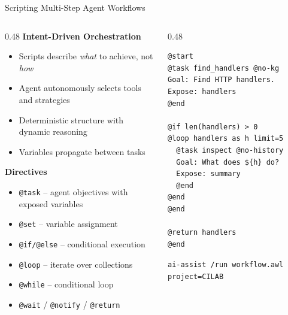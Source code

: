 \documentclass[aspectratio=169,10pt]{beamer}
\begin{document}
\begin{frame}[fragile]{Scripting Multi-Step Agent Workflows}
\begin{columns}[T]
\begin{column}{0.48\textwidth}
\textbf{Intent-Driven Orchestration}
\begin{itemize}\scriptsize\setlength{\itemsep}{1pt}
  \item Scripts describe \emph{what} to achieve, not \emph{how}
  \item Agent autonomously selects tools and strategies
  \item Deterministic structure with dynamic reasoning
  \item Variables propagate between tasks
\end{itemize}

\smallskip
\textbf{Directives}
\begin{itemize}\scriptsize\setlength{\itemsep}{1pt}
  \item \texttt{@task} -- agent objectives with exposed variables
  \item \texttt{@set} -- variable assignment
  \item \texttt{@if/@else} -- conditional execution
  \item \texttt{@loop} -- iterate over collections
  \item \texttt{@while} -- conditional loop
  \item \texttt{@wait} / \texttt{@notify} / \texttt{@return}
\end{itemize}
\end{column}
\begin{column}{0.48\textwidth}
\begin{lstlisting}[style=code,basicstyle=\ttfamily\fontsize{5.5}{7}\selectfont,language={}]
@start
@task find_handlers @no-kg
Goal: Find HTTP handlers.
Expose: handlers
@end

@if len(handlers) > 0
@loop handlers as h limit=5
  @task inspect @no-history
  Goal: What does ${h} do?
  Expose: summary
  @end
@end
@end

@return handlers
@end
\end{lstlisting}
\vspace{-2mm}
{\scriptsize\texttt{ai-assist /run workflow.awl project=CILAB}}
\end{column}
\end{columns}
\end{frame}
\end{document}
